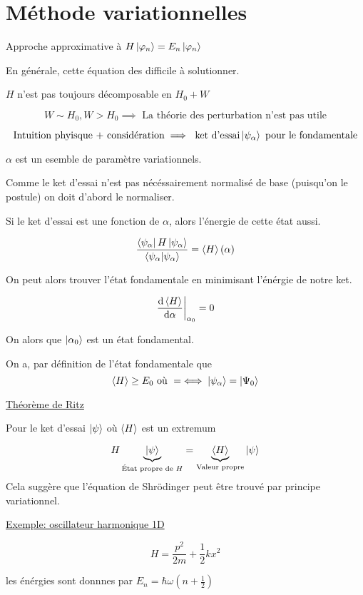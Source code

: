 



\section*{Méthode variationnelles}


Approche approximative à $H \ket{\varphi_n} = E_{n} \ket{\varphi_n}$ 


En générale, cette équation des difficile à solutionner.


$H$ n'est pas toujours décomposable en $H_{0} + W$ 

$$W \sim H_{0}, W > H_{0} \implies \text{ La théorie des perturbation n'est pas utile}$$ 


$$\text{Intuition phyisque + considération} \implies \text{ ket d'essai} \ket{\psi_{\alpha} } \text{ pour le fondamentale}$$ 

${\alpha}$ est un esemble de paramètre variationnels.

Comme le ket d'essai n'est pas nécéssairement normalisé de base (puisqu'on le postule) on doit d'abord le normaliser.


Si le ket d'essai est une fonction de $\alpha$, alors l'énergie de cette état aussi.


$$\frac{\bra{\psi_\alpha}H\ket{\psi_\alpha}}{\braket{\psi_{\alpha} }} = \left\langle H \right\rangle(\alpha)$$ 


On peut alors trouver l'état fondamentale en minimisant l'énérgie de notre ket.


$$\eval{\dv{\avg{H}}{\alpha}}_{\alpha_{0} } =0 $$ 

On alors que $\ket{\alpha_{0} }$ est un état fondamental.


On a, par définition de l'état fondamentale que 
$$\left\langle H \right\rangle \geq E_{0} \text{ où } = \iff \ket{\psi_\alpha} = \ket{\Psi_0}$$ 


\underline{Théorème de Ritz} 

Pour le ket d'essai $\ket{\psi}$ où $\left\langle H \right\rangle$ est un extremum 


$$H \underbrace{\ket{\psi}}_{\text{État propre de }H} = \underbrace{\left\langle H \right\rangle}_{\text{Valeur propre}} \ket{\psi}$$ 
Cela suggère que l'équation de Shrödinger peut être trouvé par principe variationnel.


\underline{Exemple: oscillateur harmonique 1D} 

$$H = \frac{p^2}{2m} + \frac{1}{2} kx^2$$ 

les énérgies sont donnnes par $E_{n} = \hbar\omega\left( n + \frac{1}{2}  \right) $ 

